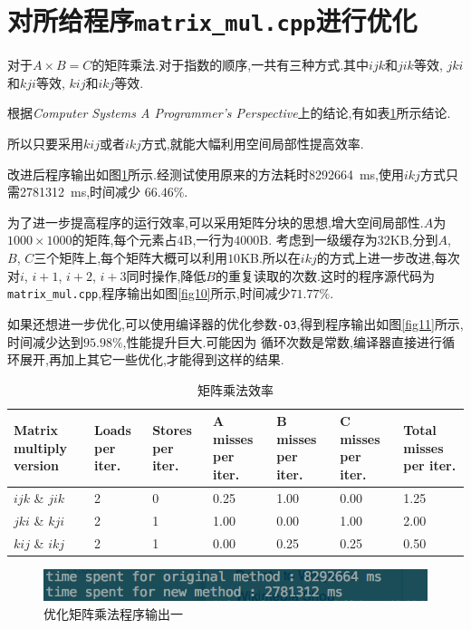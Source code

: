 \documentclass[adobefonts, nocap]{ctexart}
\begin{document}
  \section{对所给程序\texttt{matrix\_mul.cpp}进行优化}
    对于$A\times B=C$的矩阵乘法.对于指数的顺序,一共有三种方式.其中$ijk$和$jik$等效, $jki$和$kji$等效, $kij$和$ikj$等效.

    根据\textit{Computer Systems A Programmer's Perspective}上的结论,有如表\ref{tab1}所示结论.

    所以只要采用$kij$或者$ikj$方式,就能大幅利用空间局部性提高效率.

    改进后程序输出如图\ref{fig9}所示.经测试使用原来的方法耗时\SI{8292664}{\ms},使用$ikj$方式只需\SI{2781312}{\ms},时间减少
    $66.46\%$.

    为了进一步提高程序的运行效率,可以采用矩阵分块的思想,增大空间局部性.$A$为$1000\times 1000$的矩阵,每个元素占$4$B,一行为$4000$B.
    考虑到一级缓存为$32$KB,分到$A$, $B$, $C$三个矩阵上,每个矩阵大概可以利用$10$KB.所以在$ikj$的方式上进一步改进,每次对$i$, $i+1$, $i+2$,
    $i+3$同时操作,降低$B$的重复读取的次数.这时的程序源代码为\texttt{matrix\_mul.cpp},程序输出如图\ref{fig10}所示,时间减少$71.77\%$.

    如果还想进一步优化,可以使用编译器的优化参数\texttt{-O3},得到程序输出如图\ref{fig11}所示,时间减少达到$95.98\%$,性能提升巨大.可能因为
    循环次数是常数,编译器直接进行循环展开,再加上其它一些优化,才能得到这样的结果.

    \begin{table}[htbp]
      \caption{矩阵乘法效率}
      \label{tab1}
      \centering
      \begin{tabular}{p{1.5cm} p{1.5cm} p{1.5cm} p{1.5cm} p{1.5cm} p{1.5cm} p{1.5cm}}
        Matrix multiply version & Loads per iter. & Stores per iter. & A misses per iter. & B misses per iter. & C misses per iter. & Total misses per iter. \\
        \hline
        $ijk$ \& $jik$ & 2 & 0 & 0.25 & 1.00 & 0.00 & 1.25 \\
        $jki$ \& $kji$ & 2 & 1 & 1.00 & 0.00 & 1.00 & 2.00 \\
        $kij$ \& $ikj$ & 2 & 1 & 0.00 & 0.25 & 0.25 & 0.50 \\
      \end{tabular}
    \end{table}

    \begin{figure}[htbp]
      \includegraphics[width=12cm]{9.png}
      \caption{优化矩阵乘法程序输出一}
      \label{fig9}
    \end{figure}
\end{document}
